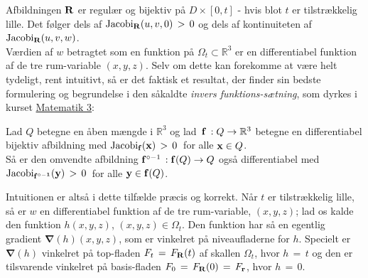 Afbildningen  ${\bf{R}}$ er regulær og bijektiv
på $D \times [0, t]$ - hvis blot $t$ er
tilstrækkelig lille. Det følger dels af
$\operatorname{Jacobi}_{{\bf{R}}}(u,v,0) \,
> \, 0$ og dels af kontinuiteten af
$\operatorname{Jacobi}_{{\bf{R}}}(u,v,w)$.\\

Værdien af $w$ betragtet som en funktion på
$\Omega_{t} \subset \mathbb{R}^{3}$ er en
differentiabel funktion af de tre rum-variable
$(x,y,z)$. Selv om dette kan forekomme at være
helt tydeligt, rent intuitivt, så er det faktisk
et resultat, der finder sin bedste formulering og
begrundelse i den såkaldte {\em{{invers
funktions-sætning}}}, som dyrkes i kurset
\href{http://www.mat.dtu.dk/Uddannelse/Civil.aspx?coursecode=01330}{Matematik 3}:


\begin{theorem}  \label{thmInvFunct}
Lad $Q$ betegne en åben mængde i $\mathbb{R}^{3}$
og lad $\,{\bf{f}}\, : Q \to \mathbb{R}^{3}$
betegne en differentiabel bijektiv afbildning med
$\operatorname{Jacobi}_{\bf{f}}({\bf{x}}) \,
> \, 0\,$ for alle ${\bf{x}} \in Q$. \\

 Så er den omvendte afbildning ${\bf{f}}^{\circ -1}\, :
{\bf{f}}(Q) \to Q$ også differentiabel med
$\operatorname{Jacobi}_{\bf{f}^{\circ -1}}({\bf{y}}) \,
> \, 0\,$ for alle ${\bf{y}} \in {\bf{f}}(Q)$.
\end{theorem}


Intuitionen er altså i dette tilfælde præcis og korrekt. Når
$t$ er tilstrækkelig lille, så er $w$ en
differentiabel funktion af de tre rum-variable,
$(x,y,z)$; lad os kalde den funktion $h(x,y,z)$,
$(x,y,z) \in \Omega_{t}$. Den funktion har så en
egentlig gradient $\bm{\nabla}(h)(x,y,z)$, som er
vinkelret på niveaufladerne for $h$. Specielt er
$\bm{\nabla}(h)$ vinkelret på top-fladen
$F_{t}\,=\,F_{\bf{R}}(t)$ af skallen
$\Omega_{t}$, hvor $h\, = \, t$ og den er
tilsvarende vinkelret på basis-fladen
$F_{0}\,=\,F_{\bf{R}}(0)\,
= \, F_{\bf{r}}$, hvor $h\, = \, 0$. \\

